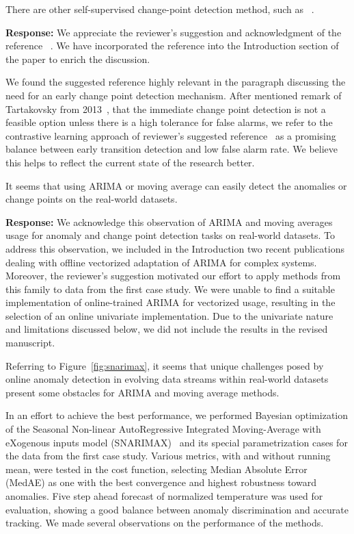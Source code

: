 \documentclass{article}
\makeatletter
\newenvironment{comment}{
\begin{sloppypar}\slshape
\vspace{5 mm}
\color{blue}
 \@beginparpenalty\@M
  \begin{list}{}{\setlength{\topsep}{0ex}%
  \setlength{\leftmargin}{\rightmargin}}\item[]
 \@beginparpenalty\@endparpenalty
}
{\end{list}
\end{sloppypar}
}
\makeatother
\begin{document}
\begin{enumerate}
  \item
        \begin{comment}
        There are other self-supervised change-point detection method, such as ~\cite{Deldari2021}.
        \end{comment}
        {\bf Response:}
        We appreciate the reviewer's suggestion and acknowledgment of the reference ~\cite{Deldari2021}. We have incorporated the reference into the Introduction section of the paper to enrich the discussion.

        We found the suggested reference highly relevant in the paragraph discussing the need for an early change point detection mechanism. After mentioned remark of Tartakovsky from 2013~\cite{Tartakovsky2013}, that the immediate change point detection is not a feasible option unless there is a high tolerance for false alarms, we refer to the contrastive learning approach of reviewer's suggested reference~\cite{Deldari2021} as a promising balance between early transition detection and low false alarm rate. We believe this helps to reflect the current state of the research better.
  \item
        \begin{comment}
        It seems that using ARIMA or moving average can easily detect the anomalies or change points on the real-world datasets.
        \end{comment}
        {\bf Response:}
        We acknowledge this observation of ARIMA and moving averages usage for anomaly and change point detection tasks on real-world datasets. To address this observation, we included in the Introduction two recent publications dealing with offline vectorized adaptation of ARIMA for complex systems. Moreover, the reviewer's suggestion motivated our effort to apply methods from this family to data from the first case study. We were unable to find a suitable implementation of online-trained ARIMA for vectorized usage, resulting in the selection of an online univariate implementation. Due to the univariate nature and limitations discussed below, we did not include the results in the revised manuscript.

        Referring to Figure~\ref{fig:snarimax}, it seems that unique challenges posed by online anomaly detection in evolving data streams within real-world datasets present some obstacles for ARIMA and moving average methods.

        In an effort to achieve the best performance, we performed Bayesian optimization of the Seasonal Non-linear AutoRegressive Integrated Moving-Average with eXogenous inputs model (SNARIMAX)~\cite{Anava2013} and its special parametrization cases for the data from the first case study. Various metrics, with and without running mean, were tested in the cost function, selecting Median Absolute Error (MedAE) as one with the best convergence and highest robustness toward anomalies. Five step ahead forecast of normalized temperature was used for evaluation, showing a good balance between anomaly discrimination and accurate tracking. We made several observations on the performance of the methods.


\end{enumerate}
\end{document}
